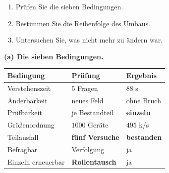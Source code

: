 \begin{aufgabe}
\begin{enumerate}[label=(\alph*)]
\item Prüfen Sie die sieben Bedingungen.
\item Bestimmen Sie die Reihenfolge des Umbaus.
\item Untersuchen Sie, was nicht mehr zu ändern war.
\end{enumerate}

\loesung
\textbf{(a) Die sieben Bedingungen.}

\begin{center}
{\small
\renewcommand{\arraystretch}{1.45}
\begin{tabular}{@{}P{3.0cm}P{2.4cm}P{2.6cm}@{}}
\toprule
\textbf{Bedingung} & \textbf{Prüfung} & \textbf{Ergebnis}\\
\midrule
Verstehenszeit & $5$ Fragen & \textcolor{mittel}{$88$ s}\\
Änderbarkeit & neues Feld & \textcolor{gruen}{ohne Bruch}\\
Prüfbarkeit & je Bestandteil & \textcolor{gruen}{\textbf{einzeln}}\\
Größenordnung & $1000$ Geräte & \textcolor{gruen}{$495$ k/s}\\
Teilausfall & \textbf{fünf Versuche} & \textcolor{gruen}{\textbf{bestanden}}\\
Befragbar & Verfolgung & \textcolor{gruen}{ja}\\
Einzeln erneuerbar & \textbf{Rollentausch} & \textcolor{gruen}{ja}\\
\bottomrule
\end{tabular}}
\end{center}

\begin{center}
\begin{minipage}{0.88\textwidth}
\end{minipage}
\end{center}

\begin{center}
\end{center}


\end{aufgabe}
